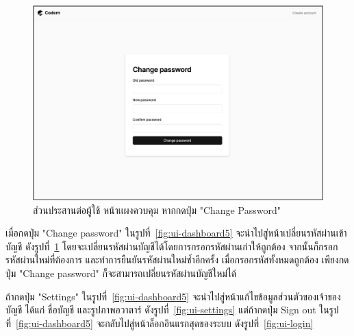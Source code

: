\documentclass[12pt,one side,openright,a4paper]{cpe-thesis-th}
\newcommand{\thaijustify}[1]{%
  \par\hspace{30pt}\justifying
  #1
}
\begin{document}
    \hypertarget{ui-settings-password}{
        \begin{figure}[H]
        \centering
            \includegraphics[width=15cm]{figure/ui/ui-settings-password.png}
            \caption[ส่วนประสานต่อผู้ใช้ หน้าตั้งค่าของผู้ใช้ (กดปุ่ม "Change Password")]{ ส่วนประสานต่อผู้ใช้ หน้าเเผงควบคุม หากกดปุ่ม "Change Password"}
            \label{fig:ui-settings-password}
        \end{figure}
    }
    \thaijustify{
        เมื่อกดปุ่ม "Change password" ในรูปที่~\ref{fig:ui-dashboard5} จะนำไปสู่หน้าเปลี่ยนรหัสผ่านเข้าบัญชี ดังรูปที่~\ref{fig:ui-settings-password} โดยจะเปลี่ยนรหัสผ่านบัญชีได้โดยการกรอกรหัสผ่านเก่าให้ถูกต้อง จากนั้นก็กรอกรหัสผ่านใหม่ที่ต้องการ และทำการยืนยันรหัสผ่านใหม่ซ้ำอีกครั้ง เมื่อกรอกรหัสทั้งหมดถูกต้อง เพียงกดปุ่ม "Change password" ก็จะสามารถเปลี่ยนรหัสผ่านบัญชีใหม่ได้
    }
    \thaijustify{
        ถ้ากดปุ่ม "Settings" ในรูปที่~\ref{fig:ui-dashboard5} จะนำไปสู่หน้าแก้ไขข้อมูลส่วนตัวของเจ้าของบัญชี ได้แก่ ชื่อบัญชี และรูปภาพอวาตาร์ ดังรูปที่~\ref{fig:ui-settings} แต่ถ้ากดปุ่ม Sign out ในรูปที่~\ref{fig:ui-dashboard5} จะกลับไปสู่หน้าล็อกอินแรกสุดของระบบ ดังรูปที่~\ref{fig:ui-login}
    }
\end{document}
